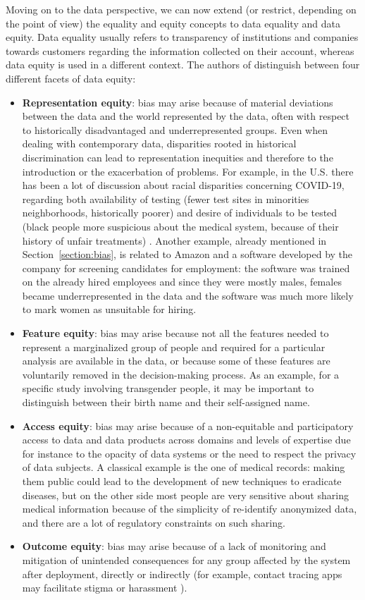 Moving on to the data perspective, we can now extend (or restrict, depending on the point of view) the equality and equity concepts to data equality and data equity. Data equality usually refers to transparency of institutions and companies towards customers regarding the information collected on their account, whereas data equity is used in a different context. The authors of \cite{jagadish2021facets} distinguish between four different facets of data equity:
\begin{itemize}
\item \textbf{Representation equity}: bias may arise because of material deviations between the data and the world represented by the data, often with respect to historically disadvantaged and underrepresented groups. Even when dealing with contemporary data, disparities rooted in historical discrimination can lead to representation inequities and therefore to the introduction or the exacerbation of problems. For example, in the U.S. there has been a lot of discussion about racial disparities concerning COVID-19, regarding both availability of testing (fewer test sites in minorities neighborhoods, historically poorer) and desire of individuals to be tested (black people more suspicious about the medical system, because of their history of unfair treatments) \cite{jagadish2021facets}. Another example, already mentioned in Section~\ref{section:bias}, is related to Amazon and a software developed by the company for screening candidates for employment: the software was trained on the already hired employees and since they were mostly males, females became underrepresented in the data and the software was much more likely to mark women as unsuitable for hiring.
\item \textbf{Feature equity}: bias may arise because not all the features needed to represent a marginalized group of people and required for a particular analysis are available in the data, or because some of these features are voluntarily removed in the decision-making process. As an example, for a specific study involving transgender people, it may be important to distinguish between their birth name and their self-assigned name.
\item \textbf{Access equity}: bias may arise because of a non-equitable and participatory access to data and data products across domains and levels of expertise due for instance to the opacity of data systems or the need to respect the privacy of data subjects. A classical example is the one of medical records: making them public could lead to the development of new techniques to eradicate diseases, but on the other side most people are very sensitive about sharing medical information because of the simplicity of re-identify anonymized data, and there are a lot of regulatory constraints on such sharing.
\item \textbf{Outcome equity}: bias may arise because of a lack of monitoring and mitigation of unintended consequences for any group affected by the system after deployment, directly or indirectly (for example, contact tracing apps may facilitate stigma or harassment \cite{jagadish2021covid}).
\end{itemize}


